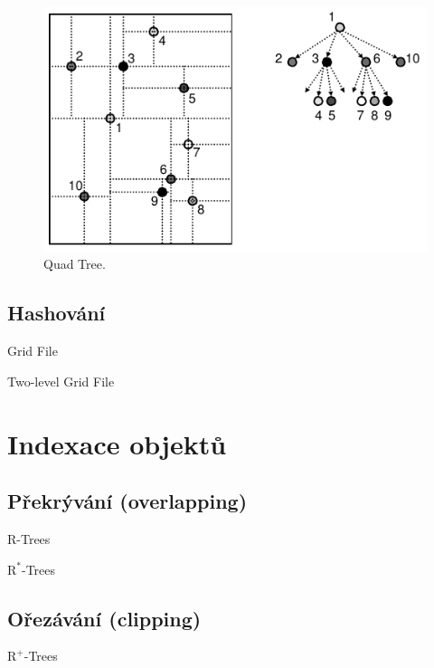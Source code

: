 \begin{figure}[H]
    \centering
    \includegraphics[width=0.75\linewidth]{quad_tree.pdf}
    \caption{Quad Tree.}
\end{figure}

\subsection{Hashování}

Grid File

Two-level Grid File



\section{Indexace objektů}


\subsection{Překrývání (overlapping)}

R-Trees

$\text{R}^*$-Trees

\subsection{Ořezávání (clipping)}

$\text{R}^+$-Trees
